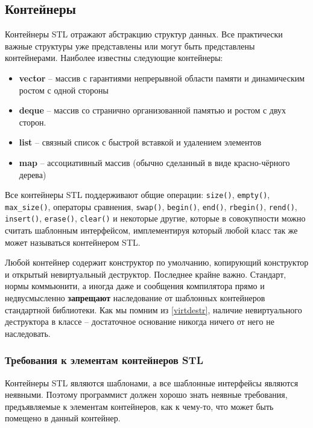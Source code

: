 \documentclass[a4paper,12pt,oneside]{article}
\begin{document}
\subsection{Контейнеры}

Контейнеры STL отражают абстракцию структур данных. Все практически важные структуры уже представлены или могут быть представлены контейнерами. Наиболее известны следующие контейнеры:

\begin{itemize}
\item \textbf{vector} -- массив с гарантиями непрерывной области памяти и динамическим ростом с одной стороны
\item \textbf{deque} -- массив со странично организованной памятью и ростом с двух сторон.
\item \textbf{list} -- связный список с быстрой вставкой и удалением элементов
\item \textbf{map} -- ассоциативный массив (обычно сделанный в виде красно-чёрного дерева)
\end{itemize}

Все контейнеры STL поддерживают общие операции: \lstinline!size()!, \lstinline!empty()!, \lstinline!max_size()!, операторы сравнения, \lstinline!swap()!, \lstinline!begin()!, \lstinline!end()!, \lstinline!rbegin()!, \lstinline!rend()!, \lstinline!insert()!, \lstinline!erase()!, \lstinline!clear()! и некоторые другие, которые в совокупности можно считать шаблонным интерфейсом, имплементируя который любой класс так же может называться контейнером STL.

Любой контейнер содержит конструктор по умолчанию, копирующий конструктор и открытый невиртуальный деструктор. Последнее крайне важно. Стандарт, нормы коммьюнити, а иногда даже и сообщения компилятора прямо и недвусмысленно \textbf{запрещают} наследование от шаблонных контейнеров стандартной библиотеки. Как мы помним из \ref{virtdestr}, наличие невиртуального деструктора в классе -- достаточное основание никогда ничего от него не наследовать.

\subsubsection{Требования к элементам контейнеров STL}

Контейнеры STL являются шаблонами, а все шаблонные интерфейсы являются неявными. Поэтому программист должен хорошо знать неявные требования, предъявляемые к элементам контейнеров, как к чему-то, что может быть помещено в данный контейнер.
\end{document}
